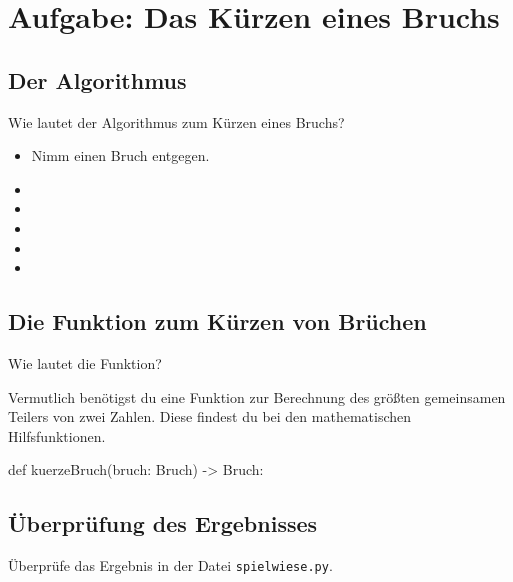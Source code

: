 \section{Aufgabe: Das Kürzen eines Bruchs}

\subsection*{Der Algorithmus}

Wie lautet der Algorithmus zum Kürzen eines Bruchs?

{\huge
\begin{itemize}
	\item Nimm einen Bruch entgegen. 
	\item  
	\item  
	\item  
	\item  
	\item  
\end{itemize}
}

\subsection*{Die Funktion zum Kürzen von Brüchen}

Wie lautet die Funktion?

Vermutlich benötigst du eine Funktion zur Berechnung des größten gemeinsamen Teilers von zwei Zahlen. Diese findest du bei den mathematischen Hilfsfunktionen.

\begin{codePython}
def kuerzeBruch(bruch: Bruch) -> Bruch:
\end{codePython}


\subsection*{Überprüfung des Ergebnisses}

Überprüfe das Ergebnis in der Datei \texttt{spielwiese.py}.